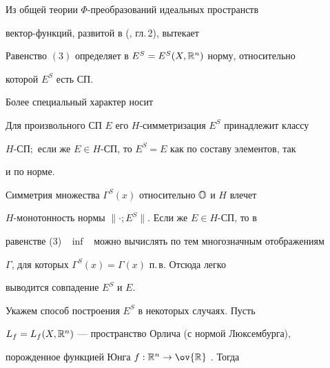  


Из общей теории $\Phi$-преобразований идеальных пространств 


вектор-функций, развитой в (\cite{7}, гл.\,2), вытекает 


 


\begin{prop} 


Равенство $(3)$ определяет в $E^S=E^S(X,\Bbb R^n)$ норму, относительно 


которой $E^S$ есть СП. 


\end{prop} 


 


Более специальный характер носит 


 


\begin{lem} 


Для произвольного СП $E$ его $H$-симметризация $E^S$ принадлежит классу 


$H$-СП$;$ если же $E\in H$-СП, то $E^S=E$ как по составу элементов, так 


и по норме. 


\end{lem} 


 


\begin{pf} 


Симметрия множества $\Gamma^S(x)$ относительно $\Bbb O$ и $H$ влечет 


$H$-монотонность нормы $\|\cdot;E^S\|$. Если же $E\in H$-СП, то в 


равенстве (3) \ $\inf$ \ можно вычислять по тем многозначным отображениям 


$\Gamma$, для которых $\Gamma^S(x)=\Gamma(x)$ п.\,в. Отсюда легко 


выводится совпадение $E^S$ и $E$. 


\end{pf} 


 


Укажем способ построения $E^S$ в некоторых случаях. Пусть 


$L_f=L_f(X,\Bbb R^n)$ --- пространство Орлича (с нормой Люксембурга), 


порожденное функцией Юнга $f:\Bbb R^n\to\ov{\Bbb R}$ \cite{3}. Тогда 


